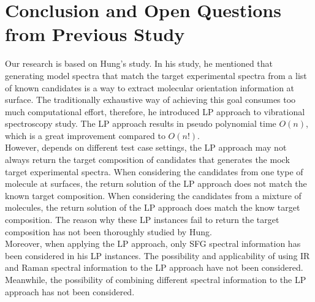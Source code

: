 \section{Conclusion and Open Questions from Previous Study \cite{KuoKaiHung:Thesis:2015}}

Our research is based on Hung's study. In his study, he mentioned that generating model spectra that match the target experimental spectra from a list of known candidates is a way to extract molecular orientation information at surface. The traditionally exhaustive way of achieving this goal consumes too much computational effort, therefore, he introduced LP approach to vibrational spectroscopy study. The LP approach results in pseudo polynomial time $O(n)$, which is a great improvement compared to $O(n!)$. \\

However, depends on different test case settings, the LP approach may not always return the target composition of candidates that generates the mock target experimental spectra. When considering the candidates from one type of molecule at surfaces, the return solution of the LP approach does not match the known target composition. When considering the candidates from a mixture of molecules, the return solution of the LP approach does match the know target composition. The reason why these LP instances fail to return the target composition has not been thoroughly studied by Hung. \\

Moreover, when applying the LP approach, only SFG spectral information has been considered in his LP instances. The possibility and applicability of using IR and Raman spectral information to the LP approach have not been considered. Meanwhile, the possibility of combining different spectral information to the LP approach has not been considered. \\
	
